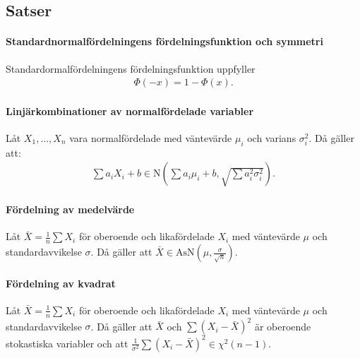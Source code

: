 \subsection{Satser}

\paragraph{Standardnormalfördelningens fördelningsfunktion och symmetri}
Standardormalfördelningens fördelningsfunktion uppfyller
\begin{align*}
	\Phi(-x) = 1 - \Phi(x).
\end{align*}

\paragraph{Linjärkombinationer av normalfördelade variabler}
Låt $X_1, \dots, X_n$ vara normalfördelade med väntevärde $\mu_i$ och varians $\sigma_i^2$. Då gäller att:
\begin{align*}
	\sum a_iX_i + b\in\text{N}\left(\sum a_i\mu_i + b, \sqrt{\sum a_i^2\sigma_i^2}\right).
\end{align*}

\paragraph{Fördelning av medelvärde}
Låt $\bar{X} = \frac{1}{n}\sum X_i$ för oberoende och likafördelade $X_i$ med väntevärde $\mu$ och standardavvikelse $\sigma$. Då gäller att $\bar{X}\in\text{AsN}\left(\mu, \frac{\sigma}{\sqrt{n}}\right)$.

\paragraph{Fördelning av kvadrat}
Låt $\bar{X} = \frac{1}{n}\sum X_i$ för oberoende och likafördelade $X_i$ med väntevärde $\mu$ och standardavvikelse $\sigma$. Då gäller att $\bar{X}$ och $\sum(X_i - \bar{X})^2$ är oberoende stokastiska variabler och att $\frac{1}{\sigma^2}\sum(X_i - \bar{X})^2\in\chi^2(n - 1)$.